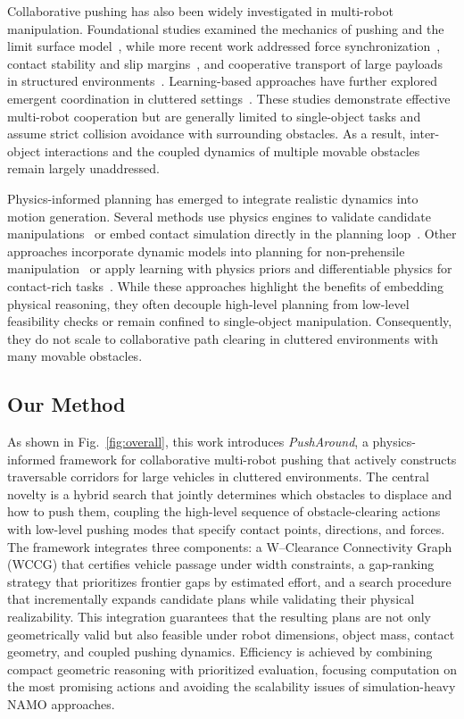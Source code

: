 Collaborative pushing has also been widely investigated in multi-robot
manipulation. Foundational studies examined the mechanics of pushing and the
limit surface model~\cite{goyal1989limit,lynch1992manipulation}, while more
recent work addressed force synchronization~\cite{ni2023progressive}, contact
stability and slip margins~\cite{liu2025physics,chen2015occlusion}, and
cooperative transport of large payloads in structured
environments~\cite{ni2024physics,wang2006multi}. Learning-based approaches have
further explored emergent coordination in cluttered
settings~\cite{feng2025learning}. These studies demonstrate effective
multi-robot cooperation but are generally limited to single-object tasks and
assume strict collision avoidance with surrounding obstacles. As a result,
inter-object interactions and the coupled dynamics of multiple movable
obstacles remain largely unaddressed.

Physics-informed planning has emerged to integrate realistic dynamics into
motion generation. Several methods use physics engines to validate candidate
manipulations~\cite{lin2019efficient} or embed contact simulation directly in
the planning loop~\cite{rouxel2024multi}. Other approaches incorporate dynamic
models into planning for non-prehensile manipulation~\cite{xue2023guided,saxena2023planning}
or apply learning with physics priors and differentiable physics for
contact-rich tasks~\cite{ni2023progressive,liu2025physics}.
While these approaches highlight the benefits of embedding physical reasoning,
they often decouple high-level planning from low-level feasibility checks or
remain confined to single-object manipulation. Consequently, they do not scale
to collaborative path clearing in cluttered environments with many movable
obstacles.


\subsection{Our Method}\label{subsec:intro-our}
As shown in Fig.~\ref{fig:overall},
this work introduces \emph{PushAround}, a physics-informed framework for
collaborative multi-robot pushing that actively constructs traversable
corridors for large vehicles in cluttered environments. The central novelty is
a hybrid search that jointly determines which obstacles to displace and how to
push them, coupling the high-level sequence of obstacle-clearing actions with
low-level pushing modes that specify contact points, directions, and forces.
The framework integrates three components: a W--Clearance Connectivity Graph
(WCCG) that certifies vehicle passage under width constraints, a gap-ranking
strategy that prioritizes frontier gaps by estimated effort, and a search
procedure that incrementally expands candidate plans while validating their
physical realizability. This integration guarantees that the resulting plans
are not only geometrically valid but also feasible under robot dimensions,
object mass, contact geometry, and coupled pushing dynamics. Efficiency is
achieved by combining compact geometric reasoning with prioritized evaluation,
focusing computation on the most promising actions and avoiding the scalability
issues of simulation-heavy NAMO approaches.


